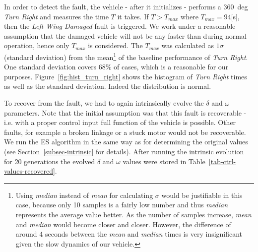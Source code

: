 In order to detect the fault, the vehicle - after it initializes - performs a 360~deg \textit{Turn Right} and measures the time $T$ it takes. If $T > T_{max}$ where $T_{max}=94$[s], then the \textit{Left Wing Damaged} fault is triggered. We work under a reasonable assumption that the damaged vehicle will not be any faster than during normal operation, hence only $T_{max}$ is considered. The $T_{max}	$ was calculated as $1\sigma$ (standard deviation) from the mean\footnote{Using \textit{median} instead of \textit{mean} for calculating $\sigma$ would be justifiable in this case, because only 10 samples is a fairly low number and thus \textit{median} represents the average value better. As the number of samples increase, \textit{mean} and \textit{median} would become closer and closer. However, the difference of around 4 seconds between the \textit{mean} and \textit{median} times is very insignificant given the slow dynamics of our vehicle.} of the baseline performance of \textit{Turn Right}. One standard deviation covers 68\% of cases, which is a reasonable for our purposes. Figure~\ref{fig:hist_turn_right} shows the histogram of \textit{Turn Right} times as well as the standard deviation. Indeed the distribution is normal. 

To recover from the fault, we had to again intrinsically evolve the $\delta$ and $\omega$ parameters. Note that the initial assumption was that this fault is recoverable - i.e. with a proper control input full function of the vehicle is possible. Other faults, for example a broken linkage or a stuck motor would not be recoverable. We run the ES algorithm in the same way as for determining the original values (see Section~\ref{subsec-intrinsic} for details). After running the intrinsic evolution for 20 generations the evolved $\delta$ and $\omega$ values were stored in Table~\ref{tab-ctrl-values-recovered}.

